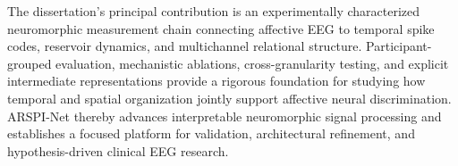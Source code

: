 \documentclass[12pt]{report}
\begin{document}
The dissertation's principal contribution is an experimentally characterized neuromorphic measurement chain connecting affective EEG to temporal spike codes, reservoir dynamics, and multichannel relational structure. Participant-grouped evaluation, mechanistic ablations, cross-granularity testing, and explicit intermediate representations provide a rigorous foundation for studying how temporal and spatial organization jointly support affective neural discrimination. ARSPI-Net thereby advances interpretable neuromorphic signal processing and establishes a focused platform for validation, architectural refinement, and hypothesis-driven clinical EEG research.

\clearpage
\tableofcontents
\clearpage
\listoffigures
\clearpage
\listoftables
\clearpage

\setcounter{page}{1}

\newpage

\newpage

\newpage

\newpage

\newpage

\newpage

\newpage

\clearpage
{}
{}


\clearpage

\end{document}
